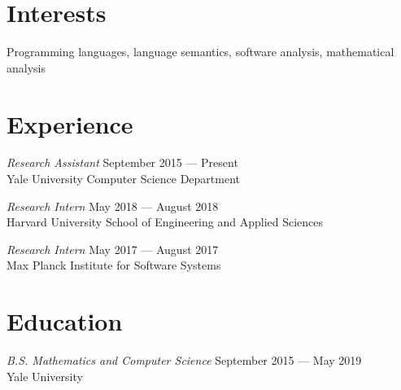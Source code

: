 \documentclass[margin]{res}
\begin{document}
 

 
\address{\textbf{Address} \\
         17 Broadway 2L \\
         New Haven, CT 06511}
 
\address{\textbf{Contact} \\
         \href{antonxue.github.io}{\texttt{antonxue.github.io}} \\
         \texttt{anton.xue@yale.edu}}

\begin{resume} 
 
\section{Interests} 
Programming languages,
language semantics,
software analysis,
mathematical analysis


\section{Experience}
\textit{Research Assistant} \hfill September 2015 --- Present \\
Yale University Computer Science Department

\textit{Research Intern} \hfill May 2018 --- August 2018 \\
Harvard University School of Engineering and Applied Sciences

\textit{Research Intern} \hfill May 2017 --- August 2017 \\
Max Planck Institute for Software Systems

\section{Education} 
\textit{B.S. Mathematics and Computer Science}
  \hfill September 2015 --- May 2019 \\
Yale University




\end{resume}
\end{document}
